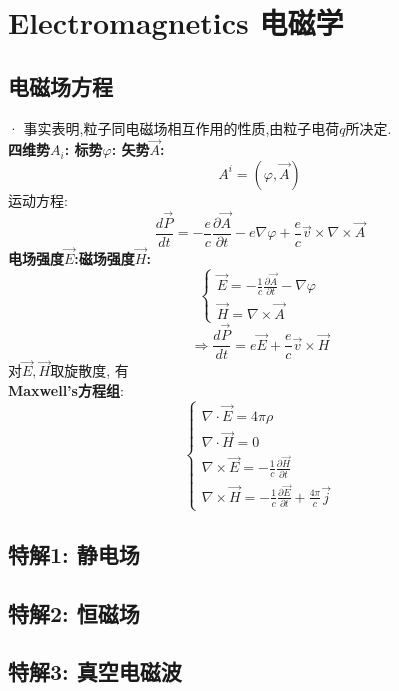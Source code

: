 \documentclass{article}
\begin{document}
\section{Electromagnetics 电磁学}
\subsection{电磁场方程}
· 事实表明,粒子同电磁场相互作用的性质,由粒子电荷$q$所决定.\\
\textbf{四维势$A_{i}$: \quad 标势$\varphi$: \quad 矢势$\vec A$:}
\[A^{i}=(\varphi,\vec A)\]
运动方程:
\[\frac{d\vec P}{dt} = - \frac{e}{c} \frac{\partial\vec A}{\partial t} - e \nabla \varphi + \frac{e}{c} \vec v \times \nabla \times \vec A\]
\textbf{电场强度$\vec E$:\quad 磁场强度$\vec H$:}
\begin{displaymath}
    \left\{ \begin{array}{ll}
    \vec E = -\frac{1}{c} \frac{\partial \vec A}{\partial t} - \nabla \varphi\\
    \vec H = \nabla \times \vec A
    \end{array} \right.
\end{displaymath}
\[\Rightarrow \frac{d\vec P}{dt} = e \vec E + \frac{e}{c} \vec v \times \vec H\]
对$\vec E,\vec H$取旋散度, 有\\
\textbf{Maxwell's方程组}:
\begin{displaymath}
    \left\{ \begin{array}{ll}
    \nabla \cdot \vec E = 4\pi\rho\\
    \nabla \cdot \vec H = 0\\
    \nabla \times \vec E = - \frac{1}{c} \frac{\partial \vec H}{\partial t}\\
    \nabla \times \vec H = - \frac{1}{c} \frac{\partial \vec E}{\partial t} + \frac{4\pi}{c}\vec j
    \end{array} \right.
\end{displaymath}


\subsection{特解1: 静电场}


\subsection{特解2: 恒磁场}


\subsection{特解3: 真空电磁波}
\end{document}
